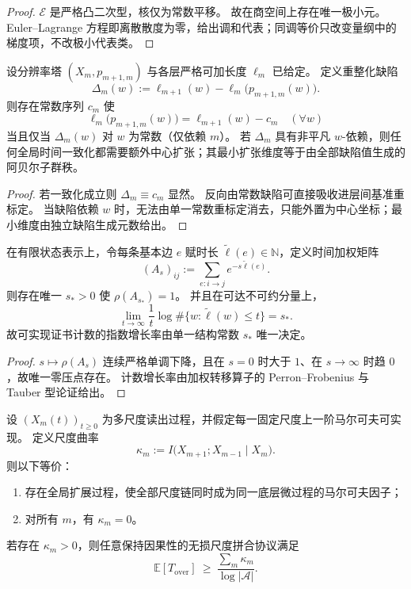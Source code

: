 \begin{proof}
\(\mathcal E\) 是严格凸二次型，核仅为常数平移。
故在商空间上存在唯一极小元。
Euler--Lagrange 方程即离散散度为零，给出调和代表；同调等价只改变量纲中的梯度项，不改极小代表类。
\end{proof}

\begin{theorem}\label{thm:xi-cross-resolution-time-renormalization-defect}
设分辨率塔 \((X_m,p_{m+1,m})\) 与各层严格可加长度 \(\ell_m\) 已给定。
定义重整化缺陷
\[
\Delta_m(w):=\ell_{m+1}(w)-\ell_m\!\bigl(p_{m+1,m}(w)\bigr).
\]
则存在常数序列 \(c_m\) 使
\[
\ell_m\!\bigl(p_{m+1,m}(w)\bigr)=\ell_{m+1}(w)-c_m\quad(\forall w)
\]
当且仅当 \(\Delta_m(w)\) 对 \(w\) 为常数（仅依赖 \(m\)）。
若 \(\Delta_m\) 具有非平凡 \(w\)-依赖，则任何全局时间一致化都需要额外中心扩张；其最小扩张维度等于由全部缺陷值生成的阿贝尔子群秩。
\end{theorem}

\begin{proof}
若一致化成立则 \(\Delta_m\equiv c_m\) 显然。
反向由常数缺陷可直接吸收进层间基准重标定。
当缺陷依赖 \(w\) 时，无法由单一常数重标定消去，只能外置为中心坐标；最小维度由独立缺陷生成元数给出。
\end{proof}

\begin{theorem}\label{thm:xi-time-weighted-spectral-radius-growth-law}
在有限状态表示上，令每条基本边 \(e\) 赋时长 \(\widetilde\ell(e)\in\mathbb N\)，定义时间加权矩阵
\[
(A_s)_{ij}:=\sum_{e:i\to j}e^{-s\widetilde\ell(e)}.
\]
则存在唯一 \(s_\ast>0\) 使 \(\rho(A_{s_\ast})=1\)。
并且在可达不可约分量上，
\[
\lim_{t\to\infty}\frac1t\log \#\{w:\widetilde\ell(w)\le t\}=s_\ast.
\]
故可实现证书计数的指数增长率由单一结构常数 \(s_\ast\) 唯一决定。
\end{theorem}

\begin{proof}
\(s\mapsto \rho(A_s)\) 连续严格单调下降，且在 \(s=0\) 时大于 \(1\)、在 \(s\to\infty\) 时趋 \(0\)，故唯一零压点存在。
计数增长率由加权转移算子的 Perron--Frobenius 与 Tauber 型论证给出。
\end{proof}

\begin{theorem}\label{thm:xi-multiscale-cmi-as-time-curvature}
设 \((X_m(t))_{t\ge 0}\) 为多尺度读出过程，并假定每一固定尺度上一阶马尔可夫可实现。
定义尺度曲率
\[
\kappa_m:=I\!\bigl(X_{m+1};X_{m-1}\mid X_m\bigr).
\]
则以下等价：
\begin{enumerate}
  \item 存在全局扩展过程，使全部尺度链同时成为同一底层微过程的马尔可夫因子；
  \item 对所有 \(m\)，有 \(\kappa_m=0\)。
\end{enumerate}
若存在 \(\kappa_m>0\)，则任意保持因果性的无损尺度拼合协议满足
\[
\mathbb E[T_{\mathrm{over}}]\ \ge\ \frac{\sum_m \kappa_m}{\log|\mathcal A|}.
\]
\end{theorem}

